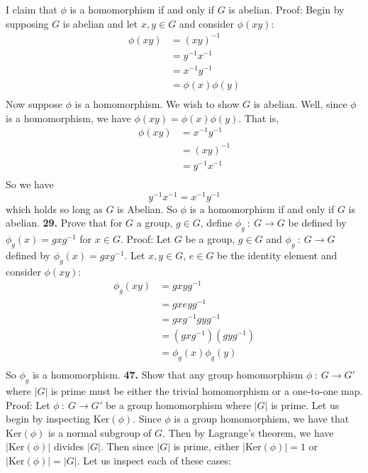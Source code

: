 \documentclass{article}
\begin{document}
I claim that $\phi$ is a homomorphism if and only if $G$ is abelian.
\newline
Proof: Begin by supposing $G$ is abelian and let $x,y \in G$ and consider $\phi(xy)$:
\begin{align*}
    \phi(xy) &= (xy)^{-1} \\
    &= y^{-1}x^{-1} \\
    &= x^{-1}y^{-1} \\
    &= \phi(x)\phi(y) \\
\end{align*}
Now suppose $\phi$ is a homomorphism. We wish to show $G$ is abelian. Well, since $\phi$ is a homomorphism, we have $\phi(xy) = \phi(x)\phi(y)$. That is,
\begin{align*}
    \phi(xy) &= x^{-1}y^{-1} \\
    &= (xy)^{-1} \\
    &= y^{-1}x^{-1} \\
\end{align*}
So we have 
\[y^{-1}x^{-1} = x^{-1}y^{-1}\]
which holds so long as $G$ is Abelian. So $\phi$ is a homomorphism if and only if $G$ is abelian.
\newline\newline\newline
\textbf{29.} Prove that for $G$ a group, $g \in G$, define $\phi_g \: : \: G \to G$ be defined by $\phi_g(x) = gxg^{-1}$ for $x \in G$. 
\newline
Proof: Let $G$ be a group, $g \in G$ and $\phi_g \: : \: G \to G$ defined by $\phi_g(x) = gxg^{-1}$. Let $x,y \in G$, $e \in G$ be the identity element and consider $\phi(xy)$:
\begin{align*}
    \phi_g(xy) &= gxyg^{-1} \\
    &= gxeyg^{-1} \\
    &= gxg^{-1}gyg^{-1} \\
    &= (gxg^{-1})(gyg^{-1}) \\
    &= \phi_g(x)\phi_g(y) \\
\end{align*}
So $\phi_g$ is a homomorphism.
\newline\newline\newline
\textbf{47.} Show that any group homomorphism $\phi \: : \: G \to G'$ where $|G|$ is prime must be either the trivial homomorphism or a one-to-one map.
\newline
Proof: Let $\phi \: : \: G \to G'$ be a group homomorphism where $|G|$ is prime. Let us begin by inspecting $\text{Ker}(\phi)$. Since $\phi$ is a group homomorphism, we have that $\text{Ker}(\phi)$ is a normal subgroup of $G$. Then by Lagrange's theorem, we have $|\text{Ker}(\phi)|$ divides $|G|$. Then since $|G|$ is prime, either $|\text{Ker}(\phi)| = 1$ or $|\text{Ker}(\phi)| = |G|$. Let us inspect each of these cases:
\end{document}
